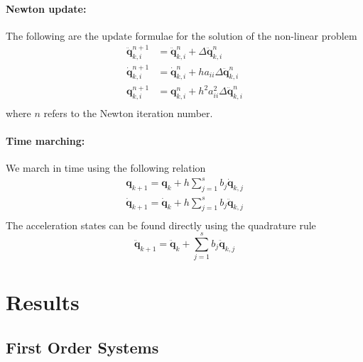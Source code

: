 \documentclass[pdftex,11pt,letter]{article}
\begin{document}
\begin{multicols}{2}
\paragraph{Newton update:}
The following are the update formulae for the solution of the non-linear problem
\begin{equation}\label{newton_update2}
  \begin{split}
    \mathbf{\ddot{q}}_{k,i}^{n+1} & = \mathbf{\ddot{q}}_{k,i}^{n} +
    \Delta\mathbf{\ddot{q}}_{k,i}^{n} \\
    \mathbf{\dot{q}}_{k,i}^{n+1} & = \mathbf{\dot{q}}_{k,i}^n + h a_{ii}
    \Delta\mathbf{\ddot{q}}_{k,i}^n \\
    \mathbf{{q}}_{k,i}^{n+1} & = \mathbf{{q}}_{k,i}^n + h^2 a_{ii}^2
    \Delta\mathbf{\ddot{q}}_{k,i}^n \\
  \end{split}
\end{equation}
where $n$ refers to the Newton iteration number.

\paragraph{Time marching:}
We march in time using the following relation
\begin{equation}
  \begin{split}
  \mathbf{q}_{k+1} = \mathbf{q}_{k} +h \sum_{j=1}^s b_j \mathbf{\dot{q}}_{k,j} \\
  \mathbf{\dot{q}}_{k+1} = \mathbf{\dot{q}}_{k} +h \sum_{j=1}^s b_j \mathbf{\ddot{q}}_{k,j} \\
  \end{split}
\end{equation}
The acceleration states can be found directly using the quadrature rule
\begin{equation}
  \mathbf{\ddot{q}}_{k+1} = \mathbf{\ddot{q}}_{k} + \sum_{j=1}^s b_j \mathbf{\ddot{q}}_{k,j}
\end{equation}



\section{Results}

\subsection{First Order Systems}


\end{multicols}
\end{document}
